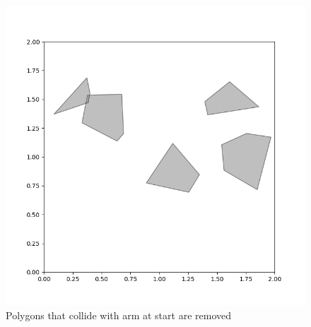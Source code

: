 \documentclass{article}
\begin{document}
\begin{figure}[H]
\begin{minipage}{0.45\textwidth}
    \includegraphics[width=\linewidth]{part4_visualization.png}
  \end{minipage}
    \caption{Polygons that collide with arm at start are removed}
\end{figure}
\end{document}
